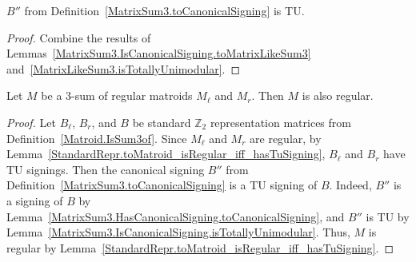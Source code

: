 \begin{lemma}
    \label{MatrixSum3.IsCanonicalSigning.isTotallyUnimodular}
    \leanok
    $B''$ from Definition~\ref{MatrixSum3.toCanonicalSigning} is TU.
\end{lemma}

\begin{proof}
    \leanok
    Combine the results of Lemmas~\ref{MatrixSum3.IsCanonicalSigning.toMatrixLikeSum3} and~\ref{MatrixLikeSum3.isTotallyUnimodular}.
\end{proof}

\begin{theorem}
    \label{Matroid.IsSum3of.isRegular}
    \leanok
    Let $M$ be a $3$-sum of regular matroids $M_{\ell}$ and $M_{r}$. Then $M$ is also regular.
\end{theorem}

\begin{proof}
    \leanok
    Let $B_{\ell}$, $B_{r}$, and $B$ be standard $\mathbb{Z}_{2}$ representation matrices from Definition~\ref{Matroid.IsSum3of}. Since $M_{\ell}$ and $M_{r}$ are regular, by Lemma~\ref{StandardRepr.toMatroid_isRegular_iff_hasTuSigning}, $B_{\ell}$ and $B_{r}$ have TU signings. Then the canonical signing $B''$ from Definition~\ref{MatrixSum3.toCanonicalSigning} is a TU signing of $B$. Indeed, $B''$ is a signing of $B$ by Lemma~\ref{MatrixSum3.HasCanonicalSigning.toCanonicalSigning}, and $B''$ is TU by Lemma~\ref{MatrixSum3.IsCanonicalSigning.isTotallyUnimodular}. Thus, $M$ is regular by Lemma~\ref{StandardRepr.toMatroid_isRegular_iff_hasTuSigning}.
\end{proof}
